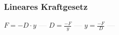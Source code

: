\subsubsection{Lineares Kraftgesetz} 
\begin{minipage}{0.45\textwidth} 
\end{minipage} 
\begin{minipage}{0.45\textwidth} 
 
\end{minipage} 
$ F = -D\cdot y $ \textcolor{lightgray}{\textbf{---}} 
$ D = \frac{-F}{y} $ \textcolor{lightgray}{\textbf{---}} 
$ y = \frac{-F}{D} $ \textcolor{lightgray}{\textbf{---}} 

